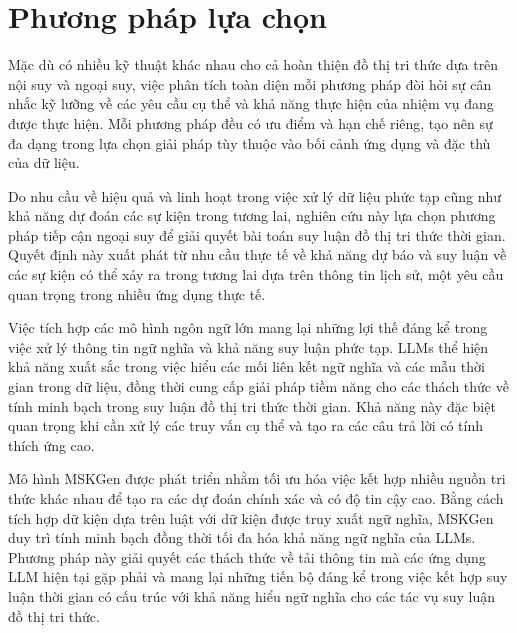 \section{Phương pháp lựa chọn}

Mặc dù có nhiều kỹ thuật khác nhau cho cả hoàn thiện đồ thị tri thức dựa trên nội suy và ngoại suy, việc phân tích toàn diện mỗi phương pháp đòi hỏi sự cân nhắc kỹ lưỡng về các yêu cầu cụ thể và khả năng thực hiện của nhiệm vụ đang được thực hiện. Mỗi phương pháp đều có ưu điểm và hạn chế riêng, tạo nên sự đa dạng trong lựa chọn giải pháp tùy thuộc vào bối cảnh ứng dụng và đặc thù của dữ liệu.

Do nhu cầu về hiệu quả và linh hoạt trong việc xử lý dữ liệu phức tạp cũng như khả năng dự đoán các sự kiện trong tương lai, nghiên cứu này lựa chọn phương pháp tiếp cận ngoại suy để giải quyết bài toán suy luận đồ thị tri thức thời gian. Quyết định này xuất phát từ nhu cầu thực tế về khả năng dự báo và suy luận về các sự kiện có thể xảy ra trong tương lai dựa trên thông tin lịch sử, một yêu cầu quan trọng trong nhiều ứng dụng thực tế.

Việc tích hợp các mô hình ngôn ngữ lớn mang lại những lợi thế đáng kể trong việc xử lý thông tin ngữ nghĩa và khả năng suy luận phức tạp. LLMs thể hiện khả năng xuất sắc trong việc hiểu các mối liên kết ngữ nghĩa và các mẫu thời gian trong dữ liệu, đồng thời cung cấp giải pháp tiềm năng cho các thách thức về tính minh bạch trong suy luận đồ thị tri thức thời gian. Khả năng này đặc biệt quan trọng khi cần xử lý các truy vấn cụ thể và tạo ra các câu trả lời có tính thích ứng cao.

Mô hình MSKGen được phát triển nhằm tối ưu hóa việc kết hợp nhiều nguồn tri thức khác nhau để tạo ra các dự đoán chính xác và có độ tin cậy cao. Bằng cách tích hợp dữ kiện dựa trên luật với dữ kiện được truy xuất ngữ nghĩa, MSKGen duy trì tính minh bạch đồng thời tối đa hóa khả năng ngữ nghĩa của LLMs. Phương pháp này giải quyết các thách thức về tải thông tin mà các ứng dụng LLM hiện tại gặp phải và mang lại những tiến bộ đáng kể trong việc kết hợp suy luận thời gian có cấu trúc với khả năng hiểu ngữ nghĩa cho các tác vụ suy luận đồ thị tri thức.